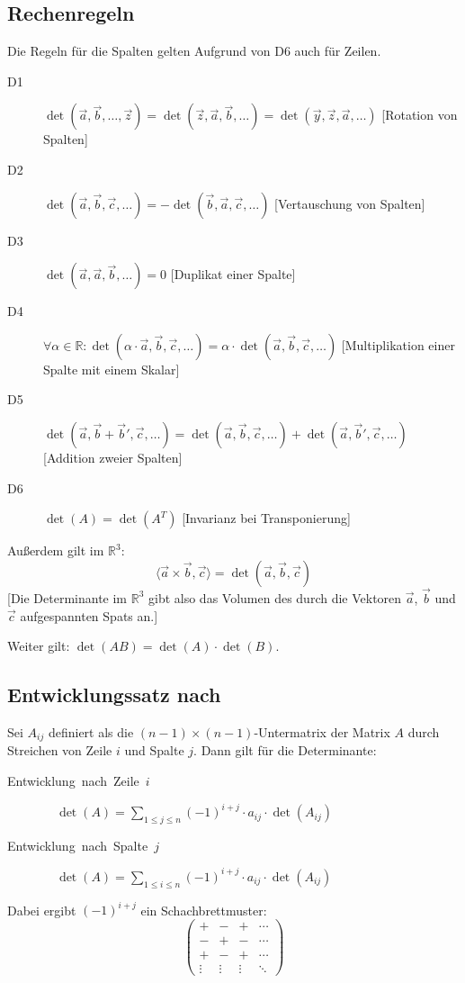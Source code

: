 \subsection{Rechenregeln}

Die Regeln für die Spalten gelten Aufgrund von D6 auch für Zeilen.
\begin{description}
  \item [{D1}]
	$\det(\vec a, \vec b, \ldots, \vec z) = \det(\vec z, \vec a, \vec b, \ldots) = \det(\vec y, \vec z, \vec a, \ldots)$
	[Rotation von Spalten]
  \item [{D2}]
	$\det(\vec a, \vec b, \vec c, \ldots) = -\det(\vec b, \vec a, \vec c, \ldots)$
	[Vertauschung von Spalten]
  \item [{D3}]
	$\det(\vec a, \vec a, \vec b, \ldots) = 0$
	[Duplikat einer Spalte]
  \item [{D4}]
	$\forall\alpha\in\mathbb R : \det(\alpha\cdot\vec a, \vec b, \vec c, \ldots) = \alpha\cdot\det(\vec a, \vec b, \vec c, \ldots)$
	[Multiplikation einer Spalte mit einem Skalar]
  \item [{D5}]
	$\det(\vec a, \vec b+\vec b', \vec c, \ldots) = \det(\vec a, \vec b, \vec c, \ldots) + \det(\vec a, \vec b', \vec c, \ldots)$
	[Addition zweier Spalten]
  \item [{D6}]
	$\det(A)=\det(A^T)$
	[Invarianz bei Transponierung]
\end{description}

Außerdem gilt im $\mathbb{R}^{3}$:
\[ \langle \vec{a}\times\vec{b},\vec{c}\rangle = \det(\vec{a},\vec{b},\vec{c}) \]
[Die Determinante im $\mathbb{R}^{3}$ gibt also das Volumen des durch die Vektoren $\vec{a}$, $\vec{b}$ und $\vec{c}$ aufgespannten Spats an.]

Weiter gilt: $\det(AB)=\det(A)\cdot\det(B)$.


\subsection{Entwicklungssatz nach \protect{}}

Sei $A_{ij}$ definiert als die $(n-1)\times(n-1)$-Untermatrix der Matrix $A$ durch Streichen von Zeile $i$ und Spalte $j$.
Dann gilt für die Determinante:
\begin{description}
  \item [{Entwicklung~nach~Zeile~$i$}]  $\quad\det(A)=\sum_{1 \leq j \leq n} (-1)^{i+j}\cdot a_{ij}\cdot\det(A_{ij})$
  \item [{Entwicklung~nach~Spalte~$j$}] $\quad\det(A)=\sum_{1 \leq i \leq n} (-1)^{i+j}\cdot a_{ij}\cdot\det(A_{ij})$
\end{description}
Dabei ergibt $(-1)^{i+j}$ ein Schachbrettmuster:
\[
\begin{pmatrix}
  + & - & + & \cdots\\
  - & + & - & \cdots\\
  + & - & + & \cdots\\
  \vdots & \vdots & \vdots & \ddots
\end{pmatrix}
\]



